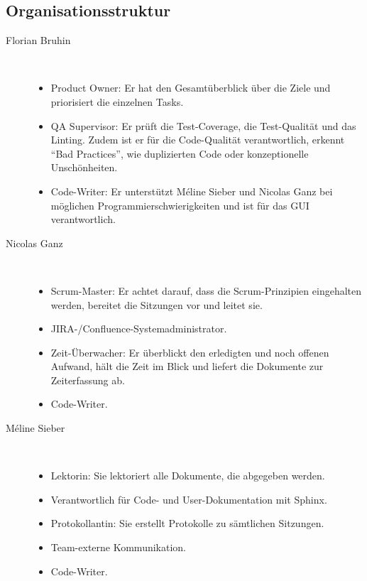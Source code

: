 \documentclass[a4paper]{article}
\begin{document}
\subsection{Organisationsstruktur}
\begin{description}

\item[Florian Bruhin] \strut \\[-1em]
  \begin{itemize}
    \item Product Owner: Er hat den Gesamtüberblick über die Ziele und priorisiert die einzelnen Tasks.
    \item QA Supervisor: Er prüft die Test-Coverage, die Test-Qualität und das Linting. Zudem ist er für die Code-Qualität verantwortlich, erkennt ``Bad Practices'', wie duplizierten Code oder konzeptionelle Unschönheiten.
    \item Code-Writer: Er unterstützt Méline Sieber und Nicolas Ganz bei möglichen Programmierschwierigkeiten und ist für das GUI verantwortlich.
  \end{itemize}
\item[Nicolas Ganz] \strut \\[-1em]
  \begin{itemize}
    \item Scrum-Master: Er achtet darauf, dass die Scrum-Prinzipien eingehalten werden, bereitet die Sitzungen vor und leitet sie.
    \item JIRA-/Confluence-Systemadministrator.
    \item Zeit-Überwacher: Er überblickt den erledigten und noch offenen Aufwand, hält die Zeit im Blick und liefert die Dokumente zur Zeiterfassung ab.
    \item Code-Writer.
  \end{itemize}
\item[Méline Sieber] \strut \\[-1em]
  \begin{itemize}
    \item Lektorin: Sie lektoriert alle Dokumente, die abgegeben werden.
    \item Verantwortlich für Code- und User-Dokumentation mit Sphinx.
    \item Protokollantin: Sie erstellt Protokolle zu sämtlichen Sitzungen.
    \item Team-externe Kommunikation.
    \item Code-Writer.
  \end{itemize}
\end{description}
\end{document}

